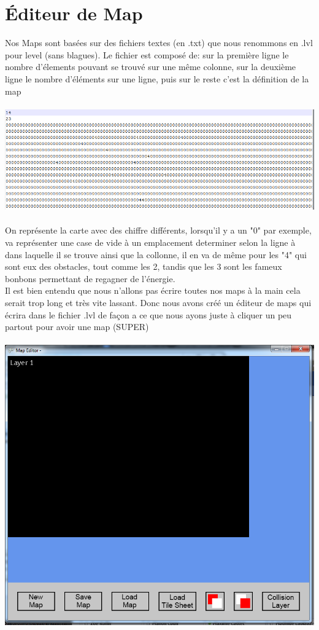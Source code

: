 \documentclass [11pt]{report}
\begin{document}
	\section{\'Editeur de Map}
	Nos Maps sont basées sur des fichiers textes (en .txt) que nous renommons en .lvl pour level (sans blagues). Le fichier est composé de: sur la première ligne le nombre d'élements pouvant se trouvé sur une même colonne, sur la deuxième ligne le nombre d'éléments sur une ligne, puis sur le reste c'est la définition de la map 
	\\
	\\
	\includegraphics[scale = 0.4]{images/lvl.png}
	\\
	\\
	On représente la carte avec des chiffre différents, lorsqu'il y a un "0" par exemple, va représenter une case de vide à un emplacement determiner selon la ligne à dans laquelle il se trouve ainsi que la collonne, il en va de même pour les "4" qui sont eux des obstacles, tout comme les 2, tandis que les 3 sont les fameux bonbons permettant de regagner de l'énergie.\\
	\indent Il est bien entendu que nous n'allons pas écrire toutes nos maps à la main cela serait trop long et très vite lassant. Donc nous avons créé un éditeur de maps qui écrira dans le fichier .lvl de façon a ce que nous ayons juste à cliquer un peu partout pour avoir une map (SUPER) 
	 \\
	 \\
	 \includegraphics[scale=0.4]{images/EditeurMap.png}
\end{document}
